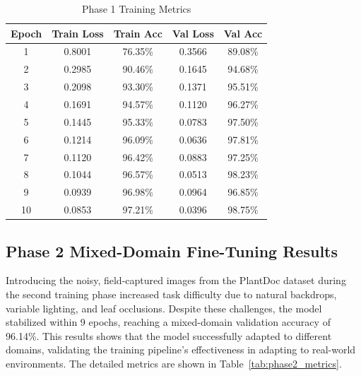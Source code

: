 \documentclass[12pt, a4paper]{report}
\begin{document}
\begin{table}[H]
\centering
\caption{Phase 1 Training Metrics}
\vspace{0.3cm}
\begin{tabular}{@{}ccccc@{}}
\toprule
\textbf{Epoch} & \textbf{Train Loss} & \textbf{Train Acc} & \textbf{Val Loss} & \textbf{Val Acc} \\
\midrule
1 & 0.8001 & 76.35\% & 0.3566 & 89.08\% \\
2 & 0.2985 & 90.46\% & 0.1645 & 94.68\% \\
3 & 0.2098 & 93.30\% & 0.1371 & 95.51\% \\
4 & 0.1691 & 94.57\% & 0.1120 & 96.27\% \\
5 & 0.1445 & 95.33\% & 0.0783 & 97.50\% \\
6 & 0.1214 & 96.09\% & 0.0636 & 97.81\% \\
7 & 0.1120 & 96.42\% & 0.0883 & 97.25\% \\
8 & 0.1044 & 96.57\% & 0.0513 & 98.23\% \\
9 & 0.0939 & 96.98\% & 0.0964 & 96.85\% \\
10 & 0.0853 & 97.21\% & 0.0396 & 98.75\% \\
\bottomrule
\end{tabular}
\label{tab:phase1_metrics}
\end{table}

\subsection{Phase 2 Mixed-Domain Fine-Tuning Results}
Introducing the noisy, field-captured images from the PlantDoc dataset during the second training phase increased task difficulty due to natural backdrops, variable lighting, and leaf occlusions. Despite these challenges, the model stabilized within 9 epochs, reaching a mixed-domain validation accuracy of 96.14\%. This results shows that the model successfully adapted to different domains, validating the training pipeline's effectiveness in adapting to real-world environments. The detailed metrics are shown in Table~\ref{tab:phase2_metrics}.
\end{document}
